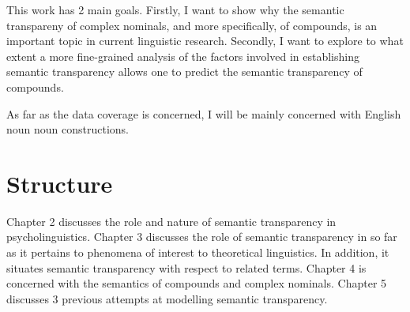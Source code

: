 This work has 2 main goals. Firstly, I want to show why the semantic
transpareny of complex nominals, and more specifically, of compounds, is an important topic in current linguistic
research. Secondly, I want to explore to what extent a more fine-grained analysis of the
factors involved in establishing semantic transparency allows one to
predict the 
semantic transparency of compounds. %

  As far as the data coverage is concerned, I will be mainly concerned with
  English noun noun constructions. 

\section{Structure}
\label{sec:struc}

Chapter 2 discusses the role and nature of semantic transparency in
psycholinguistics. Chapter 3 discusses the role of semantic
transparency in so far as it pertains to phenomena of interest to
theoretical linguistics. In addition, it situates semantic
transparency with respect to related terms. Chapter 4 is
concerned with the semantics of compounds and complex nominals. Chapter 5
discusses 3 previous attempts at modelling semantic transparency. 


